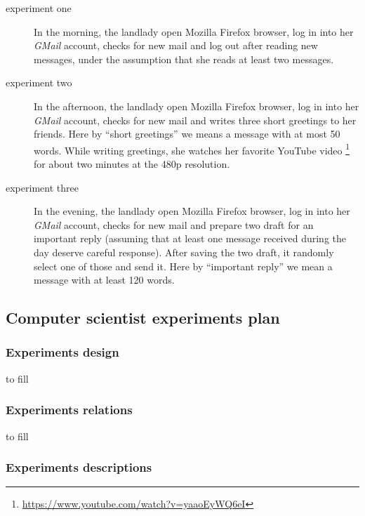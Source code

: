 \documentclass[10pt,a4paper]{article}
\begin{document}
    \begin{description}
    \item[experiment one] In the morning, the landlady open Mozilla
      Firefox browser, log in into her \emph{GMail} account, checks for
      new mail and log out after reading new messages, under the
      assumption that she reads at least two messages.
    \item[experiment two] In the afternoon, the landlady open Mozilla
      Firefox browser, log in into her \emph{GMail} account, checks
      for new mail and writes three short greetings to her
      friends. Here by ``short greetings'' we means a message with at
      most 50 words.  While writing greetings, she watches her
      favorite YouTube video
      \footnote{\url{https://www.youtube.com/watch?v=yaaoEyWQ6eI}} for
      about two minutes at the 480p resolution.
    \item[experiment three] In the evening, the landlady open Mozilla
      Firefox browser, log in into her \emph{GMail} account, checks for
      new mail and prepare two draft for an important reply (assuming
      that at least one message received during the day deserve
      careful response). After saving the two draft, it randomly
      select one of those and send it. Here by ``important reply'' we
      mean a message with at least 120 words.
    \end{description}

    \newpage
    \subsection{Computer scientist experiments plan}

    \subsubsection*{Experiments design }
    to fill

    \subsubsection*{Experiments relations}
    to fill

    \subsubsection*{Experiments descriptions}
    
\end{document}
